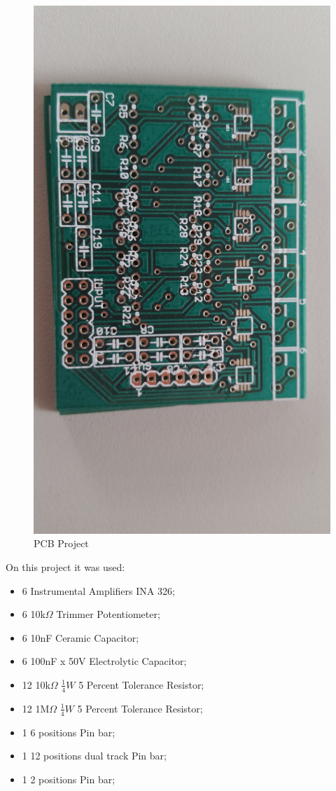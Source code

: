 \begin{figure}[!htpb]
\centering
\caption{PCB Project}
\label{INA_PCB}
\includegraphics[scale=0.08]{images/INA_board}
\end{figure}

On this project it was used:

\begin{itemize}
\item 6 Instrumental Amplifiers INA 326;
\item 6 10k$\Omega$ Trimmer Potentiometer;
\item 6 10nF Ceramic Capacitor;
\item 6 100nF x 50V Electrolytic Capacitor;
\item 12 10k$\Omega$ $\frac{1}{4}W$ 5 Percent Tolerance Resistor;
\item 12 1M$\Omega$ $\frac{1}{4}W$ 5 Percent Tolerance Resistor;
\item 1 6 positions Pin bar;
\item 1 12 positions dual track Pin bar;
\item 1 2 positions Pin bar;
\end{itemize}

